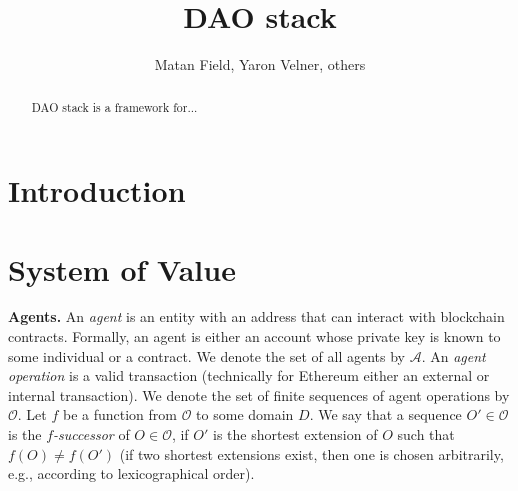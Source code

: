 \documentclass[10pt]{llncs}
\begin{document}
%

\pagestyle{plain}
 


\newcommand{\AppendixContent}[1]{}


\title{DAO stack}

\author{Matan Field, Yaron Velner, others}
\institute{}

\maketitle

\begin{abstract}
DAO stack is a framework for...
\end{abstract}
\section{Introduction}
\section{System of Value}
\noindent \textbf{Agents.} An \emph{agent} is an entity with an address that can interact with blockchain contracts. Formally, an agent is either an account whose private key is known to some individual or a contract.
\newcommand{\Agents}{\mathcal{A}}
We denote the set of all agents by $\Agents$.
An \emph{agent operation} is a valid transaction (technically for Ethereum either an external or internal transaction).
\newcommand{\AgentOperations}{\mathcal{O}}
We denote the set of finite sequences of agent operations by $\AgentOperations$.
Let $f$ be a function from $\mathcal{O}$ to some domain $D$.
We say that a sequence $O'\in \mathcal{O}$ is the \emph{$f$-successor} of $O\in \mathcal{O}$, if $O'$ is the shortest extension of $O$ such that $f(O)\neq f(O')$ (if two shortest extensions exist, then one is chosen arbitrarily, e.g., according to lexicographical order).
\end{document}

